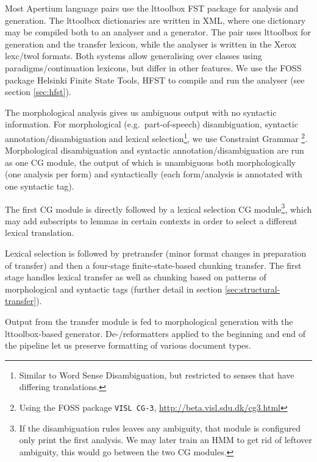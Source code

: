 Most Apertium language pairs use the lttoolbox FST package for
analysis and generation. The lttoolbox dictionaries are written in
XML, where one dictionary may be compiled both to an analyser and a
generator. The \smenob{} pair uses lttoolbox for \nob{} generation and
the transfer lexicon, while the \sme{} analyser is written in the
Xerox lexc/twol formats\citep{beesley2003fsm}. Both systems allow
generalising over classes using paradigms/continuation lexicons, but
differ in other features. We use the FOSS package Helsinki Finite
State Tools, HFST \citep{linden2011hfst} to compile and run the
analyser (see section \ref{sec:hfst}).

The morphological analysis gives us ambiguous output with no syntactic
information. For morphological (e.g.~part-of-speech) disambiguation,
syntactic annotation/disambiguation and lexical
selection\footnote{Similar to Word Sense Disambiguation, but
  restricted to senses that have differing translations.}, we use
Constraint Grammar \citep{karlsson1990cgf}\footnote{Using the FOSS
  package {\tt \small VISL CG-3},
  \href{http://beta.visl.sdu.dk/cg3.html}{http://beta.visl.sdu.dk/cg3.html}}.
Morphological disambiguation and syntactic annotation/disambiguation
are run as one CG module, the output of which is unambiguous both
morphologically (one analysis per form) and syntactically (each
form/analysis is annotated with one syntactic tag).

The first CG module is directly followed by a lexical selection CG
module\footnote{If the disambiguation rules leaves any ambiguity, that
  module is configured only print the first analysis. We may later
  train an HMM to get rid of leftover ambiguity, this would go between
  the two CG modules.}, which may add subscripts to lemmas in certain
contexts in order to select a different lexical translation. 

Lexical selection is followed by pretransfer (minor format changes in
preparation of transfer) and then a four-stage finite-state-based
chunking transfer. The first stage handles lexical transfer as well as
chunking based on patterns of morphological and syntactic tags
(further detail in section \ref{sec:structural-transfer}).

Output from the transfer module is fed to morphological generation
with the lttoolbox-based \nob{} generator. De-/reformatters applied to
the beginning and end of the pipeline let us preserve formatting of
various document types.

